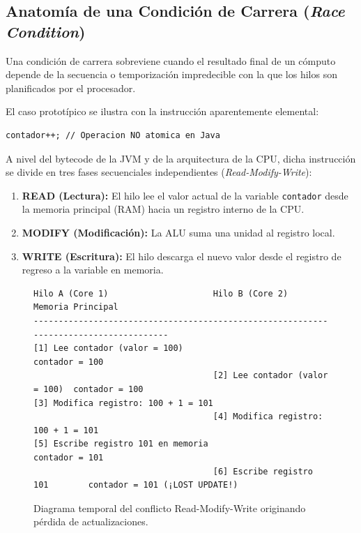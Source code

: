 \documentclass[11pt,letterpaper]{article}
\begin{document}
\subsection{Anatomía de una Condición de Carrera (\textit{Race Condition})}
Una condición de carrera sobreviene cuando el resultado final de un cómputo depende de la secuencia o temporización impredecible con la que los hilos son planificados por el procesador.

El caso prototípico se ilustra con la instrucción aparentemente elemental:
\begin{lstlisting}[style=JavaStyle,numbers=none]
contador++; // Operacion NO atomica en Java
\end{lstlisting}

A nivel del bytecode de la JVM y de la arquitectura de la CPU, dicha instrucción se divide en tres fases secuenciales independientes (\textit{Read-Modify-Write}):
\begin{enumerate}
    \item \textbf{READ (Lectura):} El hilo lee el valor actual de la variable \texttt{contador} desde la memoria principal (RAM) hacia un registro interno de la CPU.
    \item \textbf{MODIFY (Modificación):} La ALU suma una unidad al registro local.
    \item \textbf{WRITE (Escritura):} El hilo descarga el nuevo valor desde el registro de regreso a la variable en memoria.
\end{enumerate}

\begin{figure}[h!]
\centering
\begin{lstlisting}[style=TerminalStyle]
Hilo A (Core 1)                     Hilo B (Core 2)                 Memoria Principal
--------------------------------------------------------------------------------------
[1] Lee contador (valor = 100)                                      contador = 100
                                    [2] Lee contador (valor = 100)  contador = 100
[3] Modifica registro: 100 + 1 = 101
                                    [4] Modifica registro: 100 + 1 = 101
[5] Escribe registro 101 en memoria                                 contador = 101
                                    [6] Escribe registro 101        contador = 101 (¡LOST UPDATE!)
\end{lstlisting}
\caption{Diagrama temporal del conflicto Read-Modify-Write originando pérdida de actualizaciones.}
\label{fig:race_condition}
\end{figure}
\end{document}
